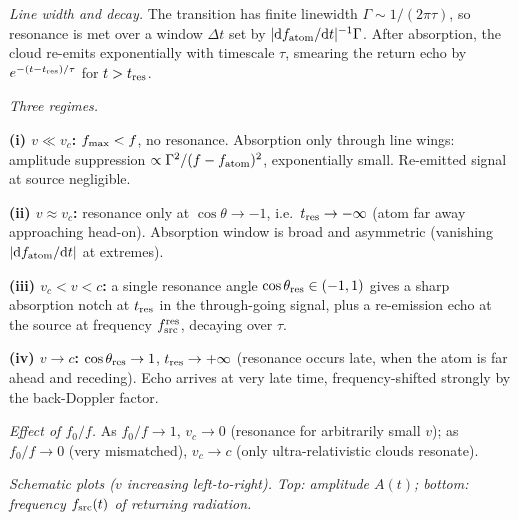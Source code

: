 \documentclass[11pt]{article}
\newcommand{\de}{\mathrm{d}}
\begin{document}
\medskip
\noindent\emph{Line width and decay.} The transition has finite linewidth $\Gamma\sim 1/(2\pi\tau)$, so resonance is met over a window $\Delta t$ set by $|\de f_{\rm atom}/\de t|^{-1}\Gamma$. After absorption, the cloud re-emits exponentially with timescale $\tau$, smearing the return echo by $e^{-(t-t_{\rm res})/\tau}$ for $t>t_{\rm res}$.

\medskip
\noindent\emph{Three regimes.}

\textbf{(i) $v\ll v_c$:} $f_{\rm max}<f$, no resonance. Absorption only through line wings: amplitude suppression $\propto\Gamma^2/(f-f_{\rm atom})^2$, exponentially small. Re-emitted signal at source negligible.

\textbf{(ii) $v\approx v_c$:} resonance only at $\cos\theta\to -1$, i.e.\ $t_{\rm res}\to-\infty$ (atom far away approaching head-on). Absorption window is broad and asymmetric (vanishing $|\de f_{\rm atom}/\de t|$ at extremes).

\textbf{(iii) $v_c < v < c$:} a single resonance angle $\cos\theta_{\rm res}\in(-1,1)$ gives a sharp absorption notch at $t_{\rm res}$ in the through-going signal, plus a re-emission echo at the source at frequency $f_{\rm src}^{\rm res}$, decaying over $\tau$.

\textbf{(iv) $v\to c$:} $\cos\theta_{\rm res}\to 1$, $t_{\rm res}\to+\infty$ (resonance occurs late, when the atom is far ahead and receding). Echo arrives at very late time, frequency-shifted strongly by the back-Doppler factor.

\medskip
\noindent\emph{Effect of $f_0/f$.} As $f_0/f\to 1$, $v_c\to 0$ (resonance for arbitrarily small $v$); as $f_0/f\to 0$ (very mismatched), $v_c\to c$ (only ultra-relativistic clouds resonate).

\medskip
\noindent\emph{Schematic plots ($v$ increasing left-to-right). Top: amplitude $A(t)$; bottom: frequency $f_{\rm src}(t)$ of returning radiation.}

\begin{center}
\end{center}
\end{document}
